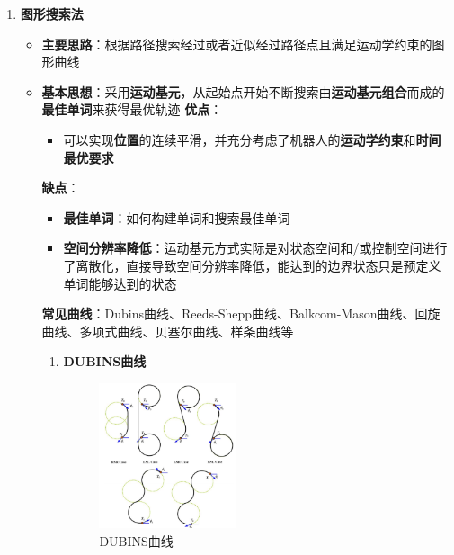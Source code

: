 \documentclass[../main.tex]{subfiles}
\begin{document}
\begin{enumerate}
    \item \textbf{图形搜索法}\label{method:graph}
        \begin{itemize}
            \item \textbf{主要思路}：根据路径搜索经过或者近似经过路径点且满足运动学约束的图形曲线
            \item \textbf{基本思想}：采用\textbf{运动基元}，从起始点开始不断搜索由\textbf{运动基元组合}而成的\textbf{最佳单词}来获得最优轨迹
            \textbf{优点}：
                \begin{itemize}
                    \item 可以实现\textbf{位置}的连续平滑，并充分考虑了机器人的\textbf{运动学约束}和\textbf{时间最优要求}
                \end{itemize}
            \textbf{缺点}：
                \begin{itemize}
                    \item \textbf{最佳单词}：如何构建单词和搜索最佳单词
                    \item \textbf{空间分辨率降低}：运动基元方式实际是对状态空间和/或控制空间进行了离散化，直接导致空间分辨率降低，能达到的边界状态只是预定义单词能够达到的状态
                \end{itemize}                
             \textbf{常见曲线}：Dubins曲线、Reeds-Shepp曲线、Balkcom-Mason曲线、回旋曲线、多项式曲线、贝塞尔曲线、样条曲线等
                \begin{enumerate}
                    \item \textbf{DUBINS曲线}
                            \begin{figure}[H]
                                \centering
                                \includegraphics[width=0.43\textwidth]{images/DUBINS.png}
                                \caption{DUBINS曲线}
                            \end{figure} 

\end{enumerate}
\end{itemize}
\end{enumerate}
\end{document}
